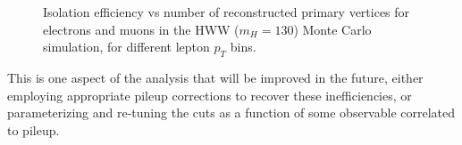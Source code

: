 \begin{figure}[!htbp]
\begin{center}
\caption{Isolation efficiency vs number of reconstructed primary vertices for electrons and muons
in the HWW ($m_{H} = 130$) Monte Carlo simulation, for different lepton $p_{T}$ bins.}
\label{fig:HWW130IsoEff_vs_NVertices_ptbins}
\end{center}
\end{figure}

This is one aspect of the analysis that will be improved in the future, either
employing appropriate pileup corrections to recover these inefficiencies, or 
parameterizing and re-tuning the cuts as a function of some observable correlated
to pileup. 


